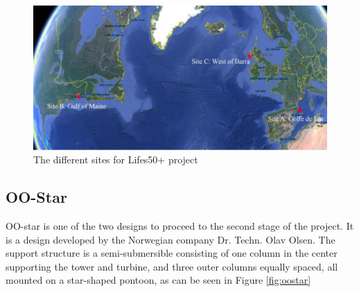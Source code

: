 \begin{figure}[H]
\centering
\includegraphics[scale=0.6]{figures/sites}
\caption[$\; \:$Sites for Lifes50+ project]{The different sites for Lifes50+ project \cite{Lifes50+D1.6} }
 \label{fig:sites}
\end{figure}

\subsection{OO-Star}
OO-star is one of the two designs to proceed to the second stage of the project. It is a design developed by the Norwegian company Dr. Techn. Olav Olsen.\newline
\newline
The support structure is a semi-submersible consisting of one column in the center supporting the tower and turbine, and three outer columns equally spaced, all mounted on a star-shaped pontoon, as can be seen in Figure \ref{fig:oostar}

